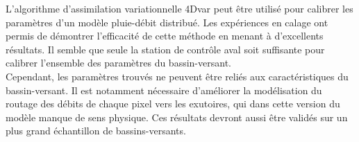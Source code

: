 \documentclass[a4paper,11pt]{article}
\begin{document}
L'algorithme d'assimilation variationnelle 4Dvar peut être utilisé pour calibrer les paramètres d'un modèle pluie-débit distribué. Les expériences en calage ont permis de démontrer l’efficacité de cette méthode en menant à d’excellents résultats. Il semble que seule la station de contrôle aval soit suffisante pour calibrer l'ensemble des paramètres du bassin-versant.\\
Cependant, les paramètres trouvés ne peuvent être reliés aux caractéristiques du bassin-versant. Il est notamment nécessaire d'améliorer la modélisation du routage des débits de chaque pixel vers les exutoires, qui dans cette version du modèle manque de sens physique. Ces résultats devront aussi être validés sur un plus grand échantillon de bassins-versants.



\end{document}
